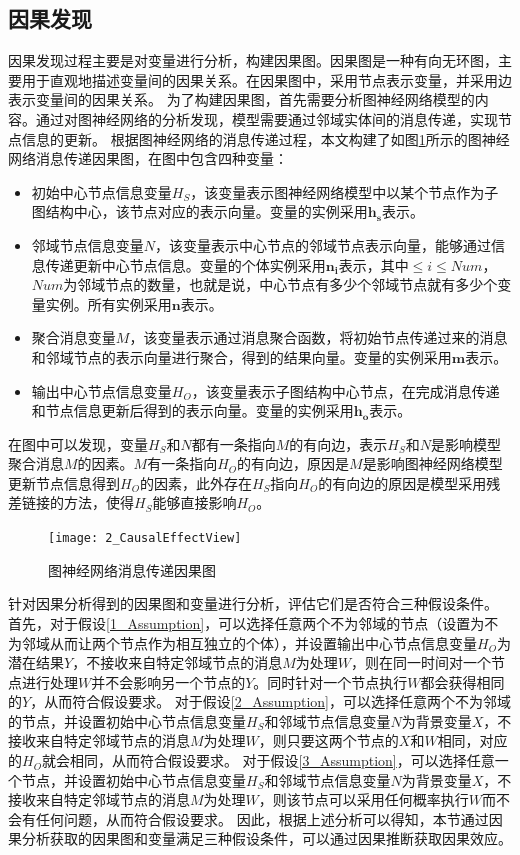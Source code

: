 \documentclass[algorithmlist, AutoFakeBold, AutoFakeSlant, figurelist, tablelist, nomlist, engineering]{seuthesix}
\begin{document}
\subsection{因果发现}
因果发现过程主要是对变量进行分析，构建因果图。因果图是一种有向无环图，主要用于直观地描述变量间的因果关系。在因果图中，采用节点表示变量，并采用边表示变量间的因果关系。
为了构建因果图，首先需要分析图神经网络模型的内容。通过对图神经网络的分析发现，模型需要通过邻域实体间的消息传递，实现节点信息的更新。
根据图神经网络的消息传递过程，本文构建了如图\ref{2_CausalEffectView}所示的图神经网络消息传递因果图，在图中包含四种变量：
\begin{itemize}
  \item [1.] 初始中心节点信息变量$H_S$，该变量表示图神经网络模型中以某个节点作为子图结构中心，该节点对应的表示向量。变量的实例采用$\bm{h_s}$表示。
  \item [2.] 邻域节点信息变量$N$，该变量表示中心节点的邻域节点表示向量，能够通过信息传递更新中心节点信息。变量的个体实例采用$\bm{n_i}$表示，其中$\leq i \leq Num$，$Num$为邻域节点的数量，也就是说，中心节点有多少个邻域节点就有多少个变量实例。所有实例采用$\bm{n}$表示。
  \item [3.] 聚合消息变量$M$，该变量表示通过消息聚合函数，将初始节点传递过来的消息和邻域节点的表示向量进行聚合，得到的结果向量。变量的实例采用$\bm{m}$表示。
  \item [4.] 输出中心节点信息变量$H_O$，该变量表示子图结构中心节点，在完成消息传递和节点信息更新后得到的表示向量。变量的实例采用$\bm{h_o}$表示。
\end{itemize}

在图中可以发现，变量$H_S$和$N$都有一条指向$M$的有向边，表示$H_S$和$N$是影响模型聚合消息$M$的因素。$M$有一条指向$H_O$的有向边，原因是$M$是影响图神经网络模型更新节点信息得到$H_O$的因素，此外存在$H_S$指向$H_O$的有向边的原因是模型采用残差链接的方法，使得$H_S$能够直接影响$H_O$。
\begin{figure}
  \centering
  \texttt{[image: 2\_CausalEffectView]}
  \caption{图神经网络消息传递因果图}
  \label{2_CausalEffectView}
\end{figure}

针对因果分析得到的因果图和变量进行分析，评估它们是否符合三种假设条件。
首先，对于假设\ref{1_Assumption}，可以选择任意两个不为邻域的节点（设置为不为邻域从而让两个节点作为相互独立的个体），并设置输出中心节点信息变量$H_O$为潜在结果$Y$，不接收来自特定邻域节点的消息$M$为处理$W$，则在同一时间对一个节点进行处理$W$并不会影响另一个节点的$Y$。同时针对一个节点执行$W$都会获得相同的$Y$，从而符合假设要求。
对于假设\ref{2_Assumption}，可以选择任意两个不为邻域的节点，并设置初始中心节点信息变量$H_S$和邻域节点信息变量$N$为背景变量$X$，不接收来自特定邻域节点的消息$M$为处理$W$，则只要这两个节点的$X$和$W$相同，对应的$H_O$就会相同，从而符合假设要求。
对于假设\ref{3_Assumption}，可以选择任意一个节点，并设置初始中心节点信息变量$H_S$和邻域节点信息变量$N$为背景变量$X$，不接收来自特定邻域节点的消息$M$为处理$W$，则该节点可以采用任何概率执行$W$而不会有任何问题，从而符合假设要求。
因此，根据上述分析可以得知，本节通过因果分析获取的因果图和变量满足三种假设条件，可以通过因果推断获取因果效应。
\end{document}
